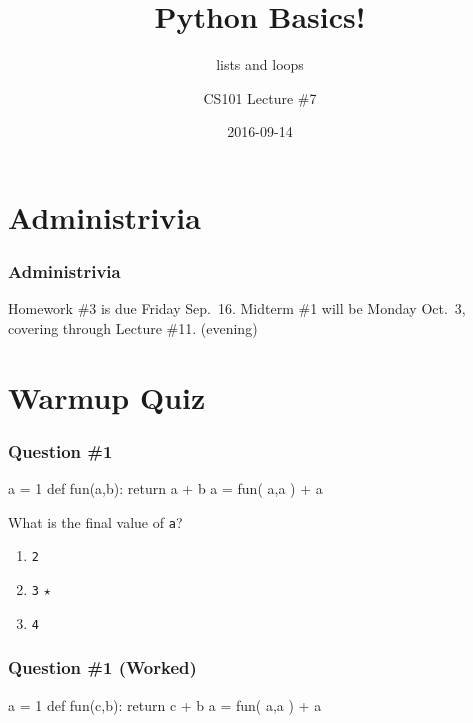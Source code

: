 \documentclass[11pt]{beamer}
\title{Python Basics!}
\subtitle{lists and loops}
\author{CS101 Lecture \#7}
\date{2016-09-14}
\begin{document}
  \setcounter{showProgressBar}{0}
  \setcounter{showSlideNumbers}{0}

\frame{\titlepage}

\setcounter{framenumber}{0}
\setcounter{showProgressBar}{1}
\setcounter{showSlideNumbers}{1}

\section{Administrivia}

\begin{frame}
  \frametitle{Administrivia}
  \Enlarge
  \begin{itemize}
  \myitem  Homework \#3 is due Friday Sep.\ 16.
  \myitem  Midterm \#1 will be Monday Oct.\ 3, covering through Lecture \#11.  (evening)
  \end{itemize}
\end{frame}

\section{Warmup Quiz}

\begin{frame}[fragile]
  \frametitle{Question \#1}
  \Enlarge

  \begin{semiverbatim}
a = 1
def fun(a,b):
    return a + b
a = fun( a,a ) + a
  \end{semiverbatim}
  What is the final value of \texttt{a}?
  \begin{enumerate}[label=\Alph*]
  \item  \texttt{2}
  \item  \texttt{3}  $\star$
  \item  \texttt{4}
  \end{enumerate}
\end{frame}

\begin{frame}[fragile]
  \frametitle{Question \#1 (Worked)}
  \Enlarge

  \begin{semiverbatim}
a = 1
def fun(c,b):
    return c + b
a = fun( a,a ) + a
  \end{semiverbatim}
\end{frame}
\end{document}
